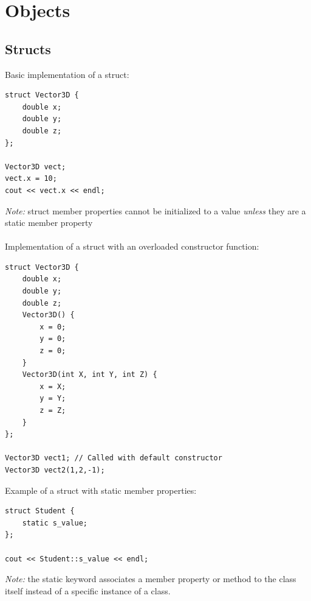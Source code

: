 \documentclass{article}
\begin{document}
\section{Objects}

\subsection{Structs}
Basic implementation of a struct:
\begin{lstlisting}
struct Vector3D {
	double x;
	double y;
	double z;
};

Vector3D vect;
vect.x = 10;
cout << vect.x << endl;
\end{lstlisting}
\emph{Note:} struct member properties cannot be initialized to a value \emph{unless} they are a static member property
\\
\\
Implementation of a struct with an overloaded constructor function:
\begin{lstlisting}
struct Vector3D {
	double x;
	double y;
	double z;
	Vector3D() {
		x = 0;
		y = 0;
		z = 0;
	}
	Vector3D(int X, int Y, int Z) {
		x = X;
		y = Y;
		z = Z;
	}
};

Vector3D vect1; // Called with default constructor
Vector3D vect2(1,2,-1);
\end{lstlisting}

Example of a struct with static member properties:
\begin{lstlisting}
struct Student {
	static s_value;
};

cout << Student::s_value << endl;
\end{lstlisting}
\emph{Note: } the static keyword associates a member property or method to the class itself instead of a specific instance of a class.
\end{document}
